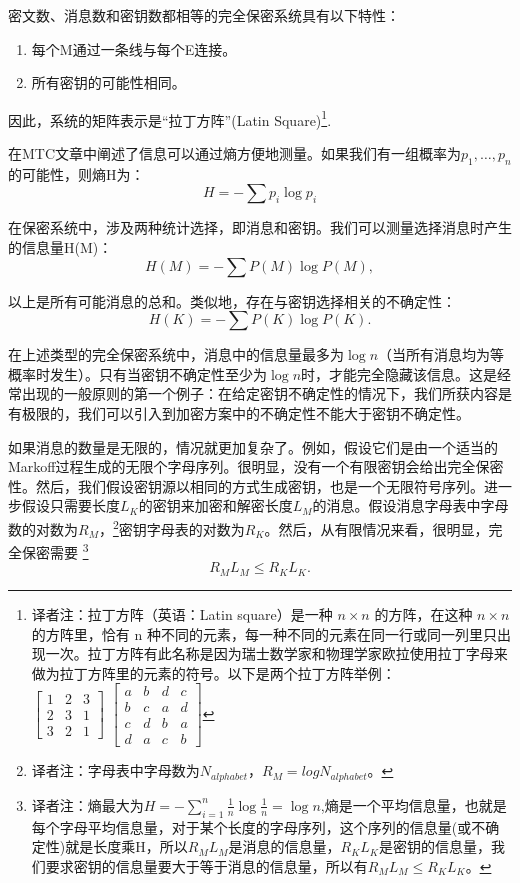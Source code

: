 \documentclass[]{article}
\begin{document}
密文数、消息数和密钥数都相等的完全保密系统具有以下特性：
\begin{enumerate}
	\item 每个M通过一条线与每个E连接。
	\item 所有密钥的可能性相同。
\end{enumerate}
因此，系统的矩阵表示是“拉丁方阵”(Latin Square)\footnote{译者注：拉丁方阵（英语：Latin square）是一种 $n\times n$ 的方阵，在这种 $n\times n$ 的方阵里，恰有 n 种不同的元素，每一种不同的元素在同一行或同一列里只出现一次。拉丁方阵有此名称是因为瑞士数学家和物理学家欧拉使用拉丁字母来做为拉丁方阵里的元素的符号。以下是两个拉丁方阵举例：\\
$\begin{bmatrix}
	1 & 2 & 3\\
	2 & 3 & 1\\
	3 & 2 & 1
\end{bmatrix}$
$\begin{bmatrix}
	a & b & d & c\\
	b & c & a & d\\
	c & d & b & a\\
	d & a & c & b
\end{bmatrix}$
}.


在MTC文章中阐述了信息可以通过熵方便地测量。如果我们有一组概率为$p_1,\ldots,p_n$的可能性，则熵H为：
\[H=-\sum p_i\log{p_i}\]

在保密系统中，涉及两种统计选择，即消息和密钥。我们可以测量选择消息时产生的信息量H(M)：
\[H(M)=-\sum P(M)\log{P(M)},\]

以上是所有可能消息的总和。类似地，存在与密钥选择相关的不确定性：
\[H(K)=-\sum P(K)\log{P(K)}.\]

在上述类型的完全保密系统中，消息中的信息量最多为$\log{n}$（当所有消息均为等概率时发生）。只有当密钥不确定性至少为$\log{n}$时，才能完全隐藏该信息。这是经常出现的一般原则的第一个例子：在给定密钥不确定性的情况下，我们所获内容是有极限的，我们可以引入到加密方案中的不确定性不能大于密钥不确定性。

如果消息的数量是无限的，情况就更加复杂了。例如，假设它们是由一个适当的Markoff过程生成的无限个字母序列。很明显，没有一个有限密钥会给出完全保密性。然后，我们假设密钥源以相同的方式生成密钥，也是一个无限符号序列。进一步假设只需要长度$L_K$的密钥来加密和解密长度$L_M$的消息。假设消息字母表中字母数的对数为$R_M$，\footnote{译者注：字母表中字母数为$N_{alphabet}$，$R_M=log N_{alphabet}$。}密钥字母表的对数为$R_K$。然后，从有限情况来看，很明显，完全保密需要
\footnote{译者注：熵最大为$H=-\sum_{i=1}^{n}{\frac{1}{n}\log{\frac{1}{n}}}=\log{n}$,熵是一个平均信息量，也就是每个字母平均信息量，对于某个长度的字母序列，这个序列的信息量(或不确定性)就是长度乘H，所以$R_ML_M$是消息的信息量，$R_KL_K$是密钥的信息量，我们要求密钥的信息量要大于等于消息的信息量，所以有$R_M L_M \leq R_K L_K$。}
\[R_M L_M \leq R_K L_K.\]
\end{document}
